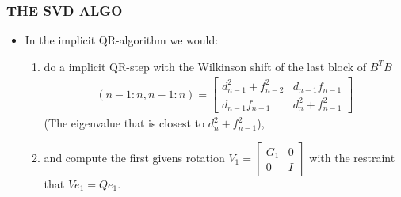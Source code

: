 \documentclass[a4paper,8pt]{beamer} %
\newcommand{\smatrix}[1]{\left[\begin{matrix} #1 \end{matrix}\right]}
\begin{document}
\begin{frame}%
\frametitle{THE SVD ALGO}
\begin{itemize}
	\item In the implicit QR-algorithm we would:
		\begin{enumerate}
			\item
				do a implicit QR-step with the Wilkinson shift of the last block of $B^TB$
				\begin{align}
					[B^TB](n-1:n,n-1:n) = \smatrix{d^2_{n-1}+f^2_{n-2} & d_{n-1}f_{n-1} \\ d_{n-1}f_{n-1} & d^2_n+f^2_{n-1}}
				\end{align}
				(The eigenvalue that is closest to $d^2_n+f^2_{n-1}$), 
			\item and compute the first givens rotation $V_1=\smatrix{G_1 & 0 \\ 0 & I}$ with the restraint that $Ve_1=Qe_1$. 
		\end{enumerate}
\end{itemize}
\end{frame}%
\end{document}
